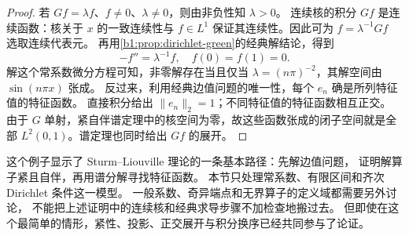 \begin{proof}
若 \(Gf=\lambda f\)、\(f\ne0\)、\(\lambda\ne0\)，则由非负性知 \(\lambda>0\)。
连续核的积分 \(Gf\) 是连续函数：核关于 \(x\) 的一致连续性与%
\(f\in L^1\) 保证其连续性。因此可为 \(f=\lambda^{-1}Gf\) 选取连续代表元。
再用\cref{b1:prop:dirichlet-green}的经典解结论，得到
\[
 -f''=\lambda^{-1}f,\quad f(0)=f(1)=0.
\]
解这个常系数微分方程可知，非零解存在当且仅当%
\(\lambda=(n\pi)^{-2}\)，其解空间由 \(\sin(n\pi x)\) 张成。
反过来，利用经典边值问题的唯一性，每个 \(e_n\) 确是所列特征值的特征函数。
直接积分给出 \(\|e_n\|_2=1\)；不同特征值的特征函数相互正交。
由于 \(G\) 单射，紧自伴谱定理中的核空间为零，故这些函数张成的闭子空间就是全部%
\(L^2(0,1)\)。谱定理也同时给出 \(Gf\) 的展开。
\end{proof}

这个例子显示了 Sturm--Liouville 理论的一条基本路径：先解边值问题，
证明解算子紧且自伴，再用谱分解寻找特征函数。
本节只处理常系数、有限区间和齐次 Dirichlet 条件这一模型。
一般系数、奇异端点和无界算子的定义域都需要另外讨论，
不能把上述证明中的连续核和经典求导步骤不加检查地搬过去。
但即使在这个最简单的情形，紧性、投影、正交展开与积分换序已经共同参与了论证。
